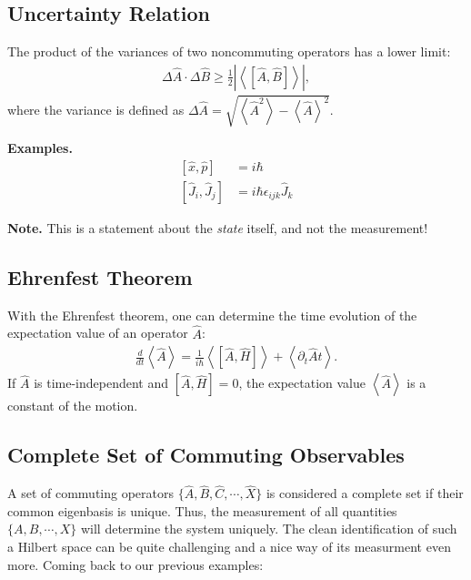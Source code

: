 \documentclass[10pt]{article}
\newcommand{\braket}[1]{\ensuremath{\left\langle#1\right\rangle}}
\begin{document}
\subsection{Uncertainty Relation}

The product of the variances of two noncommuting operators has a lower limit:
\begin{align}
    \Delta \hat{A} \cdot \Delta \hat{B} \geq \frac{1}{2} \left| \braket{\left[\hat{A},\hat{B}\right]} \right|,
\end{align}
where the variance is defined as $\Delta \hat{A} = \sqrt{\braket{\hat{A}^2}-\braket{\hat{A}}^2}$.

\textbf{Examples.}
\begin{align}
\left[ \hat{x}, \hat{p} \right] &= i \hbar \\
\left[ \hat{J}_i , \hat{J}_j \right] &= i \hbar \epsilon_{ijk} \hat{J}_k
\end{align}

\textbf{Note.} This is a statement about the \emph{state} itself, and not the measurement!

\subsection{Ehrenfest Theorem}
With the Ehrenfest theorem, one can determine the time evolution of the expectation value of an operator $\hat{A}$:
\begin{align}
 \frac{d}{dt}\braket{\hat{A}}=\frac{1}{i\hbar}\braket{\left[\hat{A},\hat{H}\right]}+\braket{\partial_t{\hat{A}}{t}}. \label{eq:ehrenfest}
\end{align}
If $\hat{A}$ is time-independent and $\left[\hat{A},\hat{H}\right]=0$, the expectation value $\braket{\hat{A}}$ is a constant of the motion.

\subsection{Complete Set of Commuting Observables}

A set of commuting operators $\{\hat{A},\hat{B},\hat{C},\cdots,\hat{X}\}$ is considered a complete set if their common eigenbasis is unique. Thus, the measurement of all quantities $\{A,B,\cdots,X\}$ will determine the system uniquely. The clean identification of such a Hilbert space can be quite challenging and a nice way of its measurment even more. Coming back to our previous examples:
\end{document}
